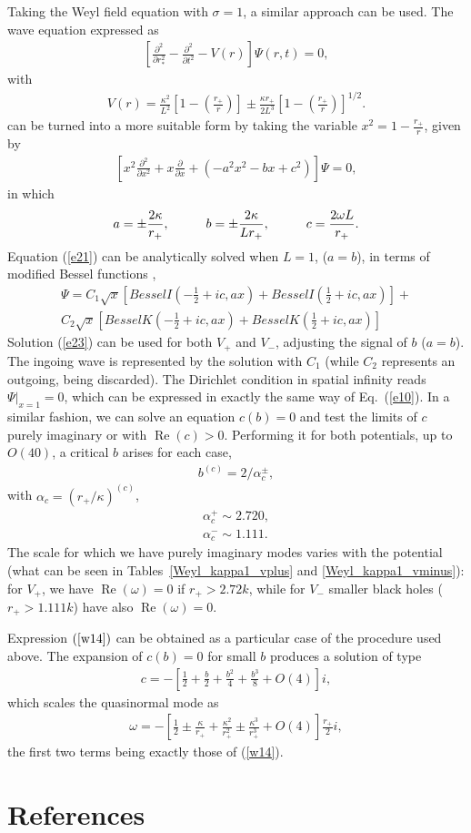 \documentclass[preprint]{revtex4-1}
\renewcommand{\Re}{\operatorname{Re}}
\def\be{\begin{eqnarray}}
\def\ee{\end{eqnarray}}
\begin{document}
Taking the Weyl field equation with $\sigma =1$, a similar approach can be used. The wave equation expressed as
\be
\label{e18}
\left[ \frac{\partial^2}{\partial r_*^2} - \frac{\partial^2}{\partial t^2} - V(r) \right] \Psi(r,t)=0,
\ee
with 
\be
\label{e19}
V(r)= \frac{\kappa^2}{L^2}\left[1- \left(\frac{r_+}{r}\right) \right] \pm \frac{\kappa r_+}{2L^3 }\left[1- \left(\frac{r_+}{r}\right) \right]^{1/2}.
\ee
can be turned into a more suitable form by taking the variable $x^2 = 1- \frac{r_+}{r}$, given by
\be
\label{e21}
\left[ x^2 \frac{\partial^2}{\partial x^2} + x\frac{\partial}{\partial x} + (-a^2x^2 - bx + c^2) \right] \Psi=0,
\ee
in which
\be
\label{e22}
a= \pm \frac{2\kappa}{r_+}, \hspace{1.0cm} b=\pm \frac{2\kappa}{Lr_+}, \hspace{1.0cm}
c=\frac{2\omega L}{r_+}.
\ee
Equation (\ref{e21}) can be analytically solved when $L=1$, ($a= b$), in terms of modified Bessel functions \cite{arfken}, 
\be
\nonumber
\Psi = C_1 \sqrt{x}\left[ Bessel I \left( -\frac{1}{2}+ic , ax \right) + Bessel I \left( \frac{1}{2}+ic , ax \right)\right] + \\
\label{e23}
C_2 \sqrt{x} \left[ Bessel K \left( -\frac{1}{2}+ic , ax \right) +Bessel K \left( \frac{1}{2}+ic , ax \right) \right]
\ee
Solution (\ref{e23}) can be used for both $V_+$ and $V_-$, adjusting the signal of $b$ ($a=b$). The ingoing wave is represented by the solution with $C_1$ (while $C_2$ represents an outgoing, being discarded). The Dirichlet condition in spatial infinity reads $\Psi |_{x=1}=0$, which can be expressed in exactly the same way of Eq.~(\ref{e10}). In a similar fashion, we can solve an equation $c(b) =0$ and test the limits of $c$ purely imaginary or with $\Re(c)>0$. Performing it for both potentials, up to $O(40)$, a critical $b$ arises for each case,
\be
\label{e24}
b^{(c)} = 2/\alpha_c^\pm, 
\ee
with $\alpha_c = (r_+ /\kappa)^{(c)}$,
\be
\label{e25}
\alpha_c^{+} \sim 2.720, \\
\label{e26}
\alpha_c^{-} \sim 1.111. 
\ee
The scale for which we have purely imaginary modes varies with the potential (what can be seen in Tables~\ref{Weyl_kappa1_vplus} and \ref{Weyl_kappa1_vminus}): for $V_+$, we have $\Re(\omega)=0$ if $r_+>2.72 k$, while for $V_-$ smaller black holes ($r_+>1.111 k$) have also $\Re(\omega)=0$.

Expression $(\ref{w14})$ can be obtained as a particular case of the procedure used above. The expansion of $c(b) =0$ for small $b$ produces a solution of type 
\be
\label{e27}
c=-\left[ \frac{1}{2} + \frac{b}{2} + \frac{b^2}{4} + \frac{b^3}{8} + O(4) \right]i,
\ee
which scales the quasinormal mode as
\be
\label{e28}
\omega =-\left[ \frac{1}{2} \pm \frac{\kappa}{r_+} + \frac{\kappa^2}{r_+^2} \pm \frac{\kappa^3}{r_+^3} + O(4) \right]\frac{r_+}{2} i,
\ee
the first two terms being exactly those of (\ref{w14}).


\section*{References}



\end{document}
